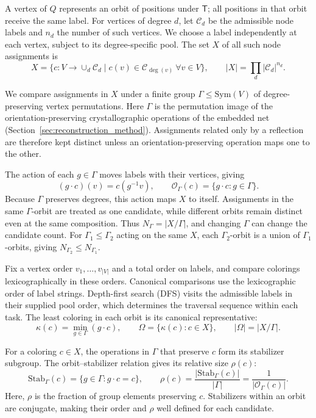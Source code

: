 \documentclass[a5paper, 10pt]{article}
\begin{document}
A vertex of $Q$ represents an orbit of positions under $\mathsf{T}$; all positions in that orbit receive the same label. For vertices of degree $d$, let $\mathcal{C}_d$ be the admissible node labels and $n_d$ the number of such vertices. We choose a label independently at each vertex, subject to its degree-specific pool. The set $X$ of all such node assignments is
\begin{equation}
X=\{c:V\to\cup_d\mathcal{C}_d\mid c(v)\in\mathcal{C}_{\deg(v)}\ \forall v\in V\},
\qquad |X|=\prod_d|\mathcal{C}_d|^{n_d}.
\label{eq:coloring_space}
\end{equation}

We compare assignments in $X$ under a finite group $\Gamma\leq\mathrm{Sym}(V)$ of degree-preserving vertex permutations.
Here $\Gamma$ is the permutation image of the orientation-preserving crystallographic operations of the embedded net (Section~\ref{sec:reconstruction_method}). Assignments related only by a reflection are therefore kept distinct unless an orientation-preserving operation maps one to the other.

The action of each $g\in\Gamma$ moves labels with their vertices, giving
\begin{equation}
(g\cdot c)(v)=c(g^{-1}v),\qquad
\mathcal{O}_{\Gamma}(c)=\{g\cdot c:g\in\Gamma\}.
\label{eq:group_action}
\end{equation}
Because $\Gamma$ preserves degrees, this action maps $X$ to itself. Assignments in the same $\Gamma$-orbit are treated as one candidate, while different orbits remain distinct even at the same composition. Thus $N_\Gamma=|X/\Gamma|$, and changing $\Gamma$ can change the candidate count. For $\Gamma_1\leq\Gamma_2$ acting on the same $X$, each $\Gamma_2$-orbit is a union of $\Gamma_1$-orbits, giving $N_{\Gamma_2}\leq N_{\Gamma_1}$.


Fix a vertex order $v_1,\ldots,v_{|V|}$ and a total order on labels, and compare colorings lexicographically in these orders. Canonical comparisons use the lexicographic order of label strings. Depth-first search (DFS) visits the admissible labels in their supplied pool order, which determines the traversal sequence within each task. The least coloring in each orbit is its canonical representative:
\begin{equation}
\kappa(c)=\min_{g\in\Gamma}(g\cdot c),\qquad
\Omega=\{\kappa(c):c\in X\},\qquad |\Omega|=|X/\Gamma|.
\label{eq:canonical_rep}
\end{equation}

For a coloring $c\in X$, the operations in $\Gamma$ that preserve $c$ form its stabilizer subgroup. The orbit--stabilizer relation gives its relative size $\rho(c)$:
\begin{equation}
\mathrm{Stab}_{\Gamma}(c)=\{g\in\Gamma:g\cdot c=c\},\qquad
\rho(c)=\frac{|\mathrm{Stab}_{\Gamma}(c)|}{|\Gamma|}
=\frac{1}{|\mathcal{O}_{\Gamma}(c)|}.
\label{eq:stabilizer_rho}
\end{equation}
Here, $\rho$ is the fraction of group elements preserving $c$. Stabilizers within an orbit are conjugate, making their order and $\rho$ well defined for each candidate.
\end{document}
